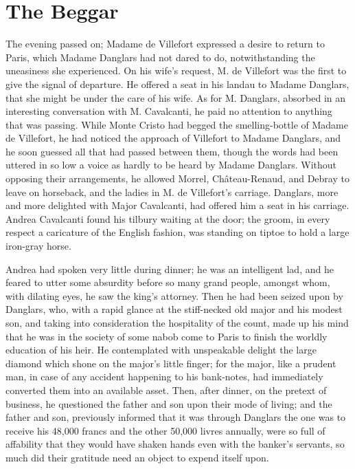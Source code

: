 \chapter{The Beggar}

The evening passed on; Madame de Villefort expressed a desire to return
to Paris, which Madame Danglars had not dared to do, notwithstanding
the uneasiness she experienced. On his wife’s request, M. de Villefort
was the first to give the signal of departure. He offered a seat in his
landau to Madame Danglars, that she might be under the care of his
wife. As for M. Danglars, absorbed in an interesting conversation with
M. Cavalcanti, he paid no attention to anything that was passing. While
Monte Cristo had begged the smelling-bottle of Madame de Villefort, he
had noticed the approach of Villefort to Madame Danglars, and he soon
guessed all that had passed between them, though the words had been
uttered in so low a voice as hardly to be heard by Madame Danglars.
Without opposing their arrangements, he allowed Morrel, Château-Renaud,
and Debray to leave on horseback, and the ladies in M. de Villefort’s
carriage. Danglars, more and more delighted with Major Cavalcanti, had
offered him a seat in his carriage. Andrea Cavalcanti found his tilbury
waiting at the door; the groom, in every respect a caricature of the
English fashion, was standing on tiptoe to hold a large iron-gray
horse.

Andrea had spoken very little during dinner; he was an intelligent lad,
and he feared to utter some absurdity before so many grand people,
amongst whom, with dilating eyes, he saw the king’s attorney. Then he
had been seized upon by Danglars, who, with a rapid glance at the
stiff-necked old major and his modest son, and taking into
consideration the hospitality of the count, made up his mind that he
was in the society of some nabob come to Paris to finish the worldly
education of his heir. He contemplated with unspeakable delight the
large diamond which shone on the major’s little finger; for the major,
like a prudent man, in case of any accident happening to his
bank-notes, had immediately converted them into an available asset.
Then, after dinner, on the pretext of business, he questioned the
father and son upon their mode of living; and the father and son,
previously informed that it was through Danglars the one was to receive
his 48,000 francs and the other 50,000 livres annually, were so full of
affability that they would have shaken hands even with the banker’s
servants, so much did their gratitude need an object to expend itself
upon.

